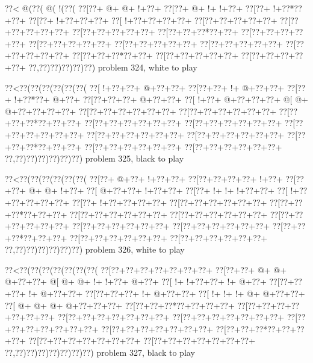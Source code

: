 \vbox{\vbox{\goo
\0??<\- @(\0??(\- @(\- !(\0??(
\0??[\0??+\- @+\- @+\- !+\0??+
\0??[\0??+\- @+\- !+\- !+\0??+
\0??[\0??+\- !+\0??*\0??+\0??+
\0??[\0??+\- !+\0??+\0??+\0??+
\0??[\- !+\0??+\0??+\0??+\0??+
\0??[\0??+\0??+\0??+\0??+\0??+
\0??[\0??+\0??+\0??+\0??+\0??+
\0??[\0??+\0??+\0??+\0??+\0??+
\0??[\0??+\0??+\0??*\0??+\0??+
\0??[\0??+\0??+\0??+\0??+\0??+
\0??[\0??+\0??+\0??+\0??+\0??+
\0??[\0??+\0??+\0??+\0??+\0??+
\0??[\0??+\0??+\0??+\0??+\0??+
\0??[\0??+\0??+\0??+\0??+\0??+
\0??[\0??+\0??+\0??*\0??+\0??+
\0??[\0??+\0??+\0??+\0??+\0??+
\0??[\0??+\0??+\0??+\0??+\0??+
\0??,\0??)\0??)\0??)\0??)\0??)
}
\hfil problem 324, white to play\hfil\break
}

\vbox{\vbox{\goo
\0??<\0??(\0??(\0??(\0??(\0??(\0??(
\0??[\- !+\0??+\0??+\- @+\0??+\0??+
\0??[\0??+\0??+\- !+\- @+\0??+\0??+
\0??[\0??+\- !+\0??*\0??+\- @+\0??+
\0??[\0??+\0??+\0??+\- @+\0??+\0??+
\0??[\- !+\0??+\- @+\0??+\0??+\0??+
\- @[\- @+\- @+\0??+\0??+\0??+\0??+
\0??[\0??+\0??+\0??+\0??+\0??+\0??+
\0??[\0??+\0??+\0??+\0??+\0??+\0??+
\0??[\0??+\0??+\0??*\0??+\0??+\0??+
\0??[\0??+\0??+\0??+\0??+\0??+\0??+
\0??[\0??+\0??+\0??+\0??+\0??+\0??+
\0??[\0??+\0??+\0??+\0??+\0??+\0??+
\0??[\0??+\0??+\0??+\0??+\0??+\0??+
\0??[\0??+\0??+\0??+\0??+\0??+\0??+
\0??[\0??+\0??+\0??*\0??+\0??+\0??+
\0??[\0??+\0??+\0??+\0??+\0??+\0??+
\0??[\0??+\0??+\0??+\0??+\0??+\0??+
\0??,\0??)\0??)\0??)\0??)\0??)\0??)
}
\hfil problem 325, black to play\hfil\break
}

\vbox{\vbox{\goo
\0??<\0??(\0??(\0??(\0??(\0??(\0??(
\0??[\0??+\- @+\0??+\- !+\0??+\0??+
\0??[\0??+\0??+\0??+\0??+\- !+\0??+
\0??[\0??+\0??+\- @+\- @+\- !+\0??+
\0??[\- @+\0??+\0??+\- !+\0??+\0??+
\0??[\0??+\- !+\- !+\- !+\0??+\0??+
\0??[\- !+\0??+\0??+\0??+\0??+\0??+
\0??[\0??+\- !+\0??+\0??+\0??+\0??+
\0??[\0??+\0??+\0??+\0??+\0??+\0??+
\0??[\0??+\0??+\0??*\0??+\0??+\0??+
\0??[\0??+\0??+\0??+\0??+\0??+\0??+
\0??[\0??+\0??+\0??+\0??+\0??+\0??+
\0??[\0??+\0??+\0??+\0??+\0??+\0??+
\0??[\0??+\0??+\0??+\0??+\0??+\0??+
\0??[\0??+\0??+\0??+\0??+\0??+\0??+
\0??[\0??+\0??+\0??*\0??+\0??+\0??+
\0??[\0??+\0??+\0??+\0??+\0??+\0??+
\0??[\0??+\0??+\0??+\0??+\0??+\0??+
\0??,\0??)\0??)\0??)\0??)\0??)\0??)
}
\hfil problem 326, white to play\hfil\break
}

\vbox{\vbox{\goo
\0??<\0??(\0??(\0??(\0??(\0??(\0??(\0??(
\0??[\0??+\0??+\0??+\0??+\0??+\0??+\0??+
\0??[\0??+\0??+\- @+\- @+\- @+\0??+\0??+
\- @[\- @+\- @+\- !+\- !+\0??+\- @+\0??+
\0??[\- !+\- !+\0??+\0??+\- !+\- @+\0??+
\0??[\0??+\0??+\0??+\- !+\- @+\0??+\0??+
\0??[\0??+\0??+\0??+\- !+\- @+\0??+\0??+
\0??[\- !+\- !+\- !+\- @+\- @+\0??+\0??+
\0??[\- @+\- @+\- @+\- @+\0??+\0??+\0??+
\0??[\0??+\0??+\0??*\0??+\0??+\0??+\0??+
\0??[\0??+\0??+\0??+\0??+\0??+\0??+\0??+
\0??[\0??+\0??+\0??+\0??+\0??+\0??+\0??+
\0??[\0??+\0??+\0??+\0??+\0??+\0??+\0??+
\0??[\0??+\0??+\0??+\0??+\0??+\0??+\0??+
\0??[\0??+\0??+\0??+\0??+\0??+\0??+\0??+
\0??[\0??+\0??+\0??*\0??+\0??+\0??+\0??+
\0??[\0??+\0??+\0??+\0??+\0??+\0??+\0??+
\0??[\0??+\0??+\0??+\0??+\0??+\0??+\0??+
\0??,\0??)\0??)\0??)\0??)\0??)\0??)\0??)
}
\hfil problem 327, black to play\hfil\break
}

